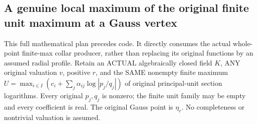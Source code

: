 \subsection{A genuine local maximum of the original finite unit maximum at a Gauss vertex}

This full mathematical plan precedes code. It directly consumes the actual
whole-point finite-max collar producer, rather than replacing its original
functions by an assumed radial profile. Retain an ACTUAL algebraically
closed field $K$, ANY original valuation $v$, positive $r$, and the SAME
nonempty finite maximum
$U=\max_{i\in I}(c_i+\sum_j\alpha_{ij}\log|p_j/q_j|)$ of original
principal-unit section logarithms. Every original $p_j,q_j$ is nonzero;
the finite unit family may be empty and every coefficient is real.
The original Gauss point is $\eta_r$. No completeness or nontrivial
valuation is assumed.

